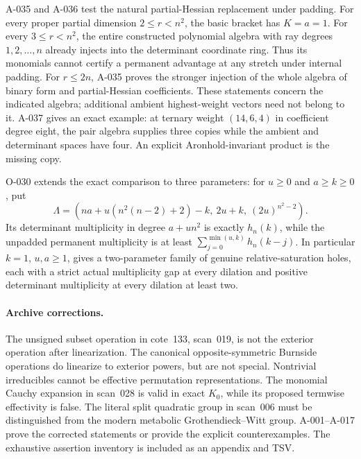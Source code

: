 \documentclass[11pt]{article}
\begin{document}
A-035 and A-036 test the natural partial-Hessian replacement under
padding. For every proper partial dimension \(2\leq r<n^2\), the
basic bracket has \(K=a=1\). For every \(3\leq r<n^2\), the entire
constructed polynomial algebra with ray degrees \(1,2,\ldots,n\)
already injects into the determinant coordinate ring. Thus its
monomials cannot certify a permanent advantage at any stretch under
internal padding. For \(r\leq2n\), A-035 proves the stronger injection
of the whole algebra of binary form and partial-Hessian coefficients.
These statements concern the indicated algebra; additional ambient
highest-weight vectors need not belong to it. A-037 gives an exact
example: at ternary weight \((14,6,4)\) in coefficient degree eight,
the pair algebra supplies three copies while the ambient and determinant
spaces have four. An explicit Aronhold-invariant product is the missing
copy.

O-030 extends the exact comparison to three parameters:
for \(u\geq0\) and \(a\geq k\geq0\), put
\[
 \Lambda=(na+u(n^2(n-2)+2)-k,\ 2u+k,\ (2u)^{n^2-2}).
\]
Its determinant multiplicity in degree \(a+un^2\) is exactly
\(h_n(k)\), while the unpadded permanent multiplicity is at least
\(\sum_{j=0}^{\min(u,k)}h_n(k-j)\).
In particular \(k=1\), \(u,a\geq1\), gives a two-parameter
family of genuine relative-saturation holes, each with a strict
actual multiplicity gap at every dilation and positive determinant
multiplicity at every dilation at least two.

\paragraph{Archive corrections.}
The unsigned subset operation in cote~133, scan~019, is not the
exterior operation after linearization. The canonical opposite-symmetric
Burnside operations do linearize to exterior powers, but are not
special. Nontrivial irreducibles cannot be effective permutation
representations. The monomial Cauchy expansion in scan~028 is valid
in exact \(K_0\), while its proposed termwise effectivity is false.
The literal split quadratic group in scan~006 must be distinguished
from the modern metabolic Grothendieck--Witt group. A-001--A-017
prove the corrected statements or provide the explicit counterexamples.
The exhaustive assertion inventory is included as an appendix and TSV.
\end{document}
